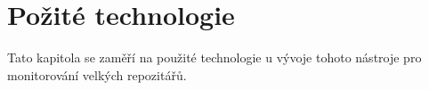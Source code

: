 \chapter{Požité technologie}
\label{chap:used_technologies}
Tato kapitola se zaměří na použité technologie u vývoje tohoto nástroje pro monitorování velkých repozitářů.
